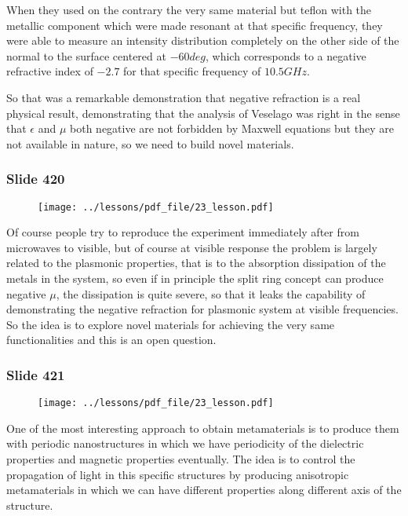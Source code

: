 \documentclass[../main/main.tex]{subfiles}
\begin{document}
When they used on the contrary the very same material but teflon with the metallic component which were made resonant at that specific frequency, they were able to measure an intensity distribution completely on the other side of the normal to the surface centered at $-60deg$, which corresponds to a negative refractive index of $-2.7$ for that specific frequency of $10.5GHz$.

So that was a remarkable demonstration that negative refraction is a real physical result, demonstrating that the analysis of Veselago was right in the sense that $\epsilon$ and $\mu$ both negative are not forbidden by Maxwell equations but they are not available in nature, so we need to build novel materials.

\newpage

\subsubsection{Slide 420}

\begin{figure}[h!]
\centering
\texttt{[image: ../lessons/pdf\_file/23\_lesson.pdf]}
\end{figure}

Of course people try to reproduce the experiment immediately after from microwaves to visible, but of course at visible response the problem is largely related to the plasmonic properties, that is to the absorption dissipation of the metals in the system, so even if in principle the split ring concept can produce negative $\mu$, the dissipation is quite severe, so that it leaks the capability of demonstrating the negative refraction for plasmonic system at visible frequencies. So the idea is to explore novel materials for achieving the very same functionalities and this is an open question.

\newpage

\subsubsection{Slide 421}

\begin{figure}[h!]
\centering
\texttt{[image: ../lessons/pdf\_file/23\_lesson.pdf]}
\end{figure}

One of the most interesting approach to obtain metamaterials is to produce them with periodic nanostructures in which we have periodicity of the dielectric properties and magnetic properties eventually. The idea is to control  the propagation of light in this specific structures by producing anisotropic metamaterials in which we can have different properties along different axis of the structure.
\end{document}
